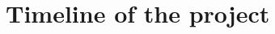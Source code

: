 \documentclass[11pt]{report}
\begin{document}
\chapter{Timeline of the project}

\newpage




\newpage
\setcounter{chapter}{9}
% 
% 
% 
\printbibliography

\appendix

\end{document}
